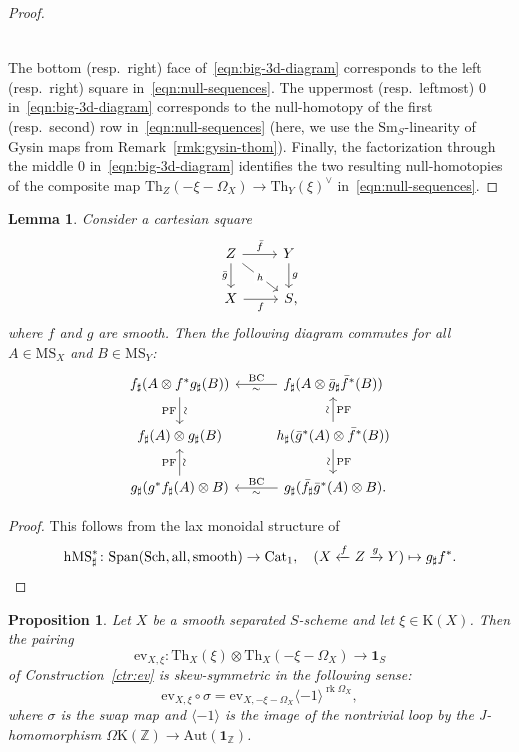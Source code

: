 \documentclass{amsart}
\numberwithin{equation}{section}
\theoremstyle{plain}
\newtheorem{proposition}[equation]{Proposition}
\newtheorem{lemma}[equation]{Lemma}
\theoremstyle{definition}
\let\bb=\mathbb
\def\Z{\bb Z}
\def\1{\mathbf 1}
\def\h{\mathrm h}
\def\Aut{\mathrm{Aut}}
\def\Th{\mathrm{Th}}
\DeclareMathOperator{\rk}{rk}
\let\cat=\mathrm
\def\K{\mathrm{K}{}}
\def\Sch{\cat{S}\mathrm{ch}{}}
\def\Sm{{\cat{S}\mathrm{m}}}
\def\MS{\mathrm{MS}}
\def\ev{\mathrm{ev}}
\def\Cat{\mathrm{C}\mathrm{at}{}}
\def\all{\mathrm{all}}
\def\Span{\mathrm{Span}}
\begin{document}
\begin{proof}
\[\begin{tikzcd}
	\end{tikzcd}
	\]
	The bottom (resp.\ right) face of~\eqref{eqn:big-3d-diagram} corresponds to the left (resp.\ right) square in~\eqref{eqn:null-sequences}.
	The uppermost (resp.\ leftmost) $0$ in~\eqref{eqn:big-3d-diagram} corresponds to the null-homotopy of the first (resp.\ second) row in~\eqref{eqn:null-sequences} (here, we use the $\Sm_S$-linearity of Gysin maps from Remark~\ref{rmk:gysin-thom}).
	Finally, the factorization through the middle $0$ in~\eqref{eqn:big-3d-diagram} identifies the two resulting null-homotopies of the composite map $\Th_Z(-\xi-\Omega_X)\to \Th_Y(\xi)^\vee$ in~\eqref{eqn:null-sequences}.
\end{proof}

\begin{lemma}\label{lem:PF-BC}
	Consider a cartesian square
	\[
	\begin{tikzcd}
	Z \ar{d}[swap]{\bar g} \ar{r}{\bar f} \ar{dr}[description]{h} & Y \ar{d}{g} \\
	X \ar{r}[swap]{f} & S\rlap,
	\end{tikzcd}
	\]
	where $f$ and $g$ are smooth.
	Then the following diagram commutes for all $A\in \MS_X$ and $B\in\MS_Y$:
	\[
	\begin{tikzcd}[column sep=2.5em]
	f_\sharp (A\otimes f^*g_\sharp (B)) \ar{d}[sloped]{\sim}[swap]{\mathrm{PF}} \ar[<-]{r}{\mathrm{BC}}[swap]{\sim} & f_\sharp (A\otimes \bar g_\sharp \bar f^*(B))  \\
	f_\sharp (A)\otimes g_\sharp (B) & h_\sharp (\bar g^*(A)\otimes \bar f^*(B)) \ar{d}{\mathrm{PF}}[swap,sloped]{\sim} \ar{u}[sloped]{\sim}[swap]{\mathrm{PF}}  \\
	g_\sharp (g^*f_\sharp (A)\otimes B) \ar{u}{\mathrm{PF}}[swap,sloped]{\sim} \ar[<-]{r}{\mathrm{BC}}[swap]{\sim} & g_\sharp (\bar f_\sharp \bar g^*(A)\otimes B)\rlap.
	\end{tikzcd}
	\]
\end{lemma}

\begin{proof}
This follows from the lax monoidal structure of 
\[
\h\MS^*_{\sharp}\colon \Span(\Sch,\all,\mathrm{smooth})\to\Cat_1, \quad (X\xleftarrow{f} Z\xrightarrow{g} Y)\mapsto g_{\sharp} f^*.\qedhere
\]
\end{proof}

\begin{proposition}\label{prop:skew-symmetry}
	Let $X$ be a smooth separated $S$-scheme and let $\xi\in\K(X)$. Then the pairing
	\[
	\ev_{X,\xi}\colon \Th_X(\xi) \otimes \Th_X(-\xi-\Omega_X) \to \1_S
	\]
	of Construction~\ref{ctr:ev} is skew-symmetric in the following sense:
	\[
	\ev_{X,\xi}\circ\sigma = \ev_{X,-\xi-\Omega_X} \langle -1\rangle^{\rk\Omega_X},
	\]
	where $\sigma$ is the swap map and $\langle -1\rangle$ is the image of the nontrivial loop by the J-homomorphism $\Omega\K(\Z)\to\Aut(\1_\Z)$.
\end{proposition}
\end{document}
